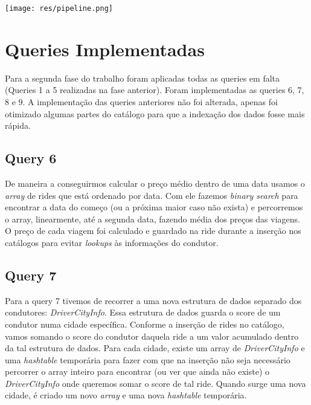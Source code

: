 \documentclass{article}
\begin{document}
        \bigskip
        
        \begin{center}
            \texttt{[image: res/pipeline.png]}
        \end{center}

    \section{Queries Implementadas}
        Para a segunda fase do trabalho foram aplicadas todas as queries em falta
        (Queries 1 a 5 realizadas na fase anterior). Foram implementadas as queries 6, 7, 8 e 9.
        A implementação das queries anteriores não foi alterada, apenas foi otimizado
        algumas partes do catálogo para que a indexação dos dados fosse mais rápida.
        \subsection{Query 6}
            De maneira a conseguirmos calcular o preço médio dentro de uma data usamos
            o \emph{array} de rides que está ordenado por data. Com ele fazemos \emph{binary search} para
            encontrar a data do começo (ou a próxima maior caso não exista) e percorremos o array, 
            linearmente, até a segunda data, fazendo média dos preços das viagens. O preço
            de cada viagem foi calculado e guardado na ride durante a inserção nos catálogos para evitar
            \emph{lookups} às informações do condutor.
        \subsection{Query 7}
            Para a query 7 tivemos de recorrer a uma nova estrutura de dados separado dos condutores: \emph{DriverCityInfo}. 
            Essa estrutura de dados guarda o score de um condutor numa cidade específica.
            Conforme a inserção de rides no catálogo, vamos somando o score do condutor daquela ride
            a um valor acumulado dentro da tal estrutura de dados. Para cada cidade, existe um array de \emph{DriverCityInfo} e
            uma \emph{hashtable} temporária para fazer com que na inserção não
            seja necessário percorrer o array inteiro para encontrar (ou ver que ainda não existe)
            o \emph{DriverCityInfo} onde queremos somar o score de tal ride. 
            Quando surge uma nova cidade, é criado um novo \emph{array} e uma nova \emph{hashtable} temporária.
            
\end{document}
